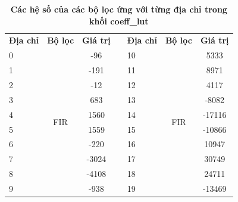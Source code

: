 \begin{table}[H]
\centering
    \caption[Các hệ số của các bộ lọc ứng với từng địa chỉ trong khối coeff\_lut]{\bfseries \fontsize{12pt}{0pt}\selectfont Các hệ số của các bộ lọc ứng với từng địa chỉ trong khối coeff\_lut}
\begin{tabular}{|l|c|c|l|l|c|c|}
\cline{1-3} \cline{5-7}
\multicolumn{1}{|c|}{\textbf{Địa chỉ}} & \textbf{Bộ lọc}       & \textbf{Giá trị} &  & \multicolumn{1}{c|}{\textbf{Địa chỉ}} & \textbf{Bộ lọc}       & \textbf{Giá trị} \\ \cline{1-3} \cline{5-7} 
0                                      & \multirow{10}{*}{FIR} & -96              &  & 10                                    & \multirow{10}{*}{FIR} & 5333             \\ \cline{1-1} \cline{3-3} \cline{5-5} \cline{7-7} 
1 &  & -191  &  & 11 &  & 8971   \\ \cline{1-1} \cline{3-3} \cline{5-5} \cline{7-7} 
2 &  & -12   &  & 12 &  & 4117   \\ \cline{1-1} \cline{3-3} \cline{5-5} \cline{7-7} 
3 &  & 683   &  & 13 &  & -8082  \\ \cline{1-1} \cline{3-3} \cline{5-5} \cline{7-7} 
4 &  & 1560  &  & 14 &  & -17116 \\ \cline{1-1} \cline{3-3} \cline{5-5} \cline{7-7} 
5 &  & 1559  &  & 15 &  & -10866 \\ \cline{1-1} \cline{3-3} \cline{5-5} \cline{7-7} 
6 &  & -220  &  & 16 &  & 10947  \\ \cline{1-1} \cline{3-3} \cline{5-5} \cline{7-7} 
7 &  & -3024 &  & 17 &  & 30749  \\ \cline{1-1} \cline{3-3} \cline{5-5} \cline{7-7} 
8 &  & -4108 &  & 18 &  & 24711  \\ \cline{1-1} \cline{3-3} \cline{5-5} \cline{7-7} 
9 &  & -938  &  & 19 &  & -13469 \\ \cline{1-3} \cline{5-7} 
\end{tabular}
\label{coeffff}
\end{table}
